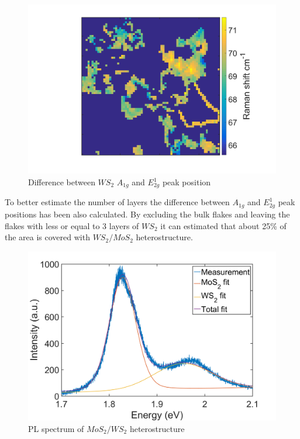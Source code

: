 \begin{figure}[H]
	\begin{center}
		\includegraphics[scale=0.3]{Heterostructures/HeterostructureRamanDifferenceW.png}
		\caption{Difference between $WS_2$ $A_{1g}$ and $E^1_{2g}$ peak position}
		\label{fig:HeterostructuresRamanDifferenceW}
	\end{center}
\end{figure}

To better estimate the number of layers the difference between $A_{1g}$ and $E^1_{2g}$ peak positions has been also calculated. By excluding the bulk flakes and leaving the flakes with less or equal to 3 layers of $WS_2$ it can estimated that about 25\% of the area is covered with $WS_2/MoS_2$ heterostructure.

\begin{figure}[H]
	\begin{center}
		\includegraphics[scale=0.3]{Heterostructures/HeterostructurePLSpectrumFitted.png}
		\caption{PL spectrum of $MoS_2/WS_2$ heterostructure}
		\label{fig:HeterostructuresPLSpectrumFitted}
	\end{center}
\end{figure}

